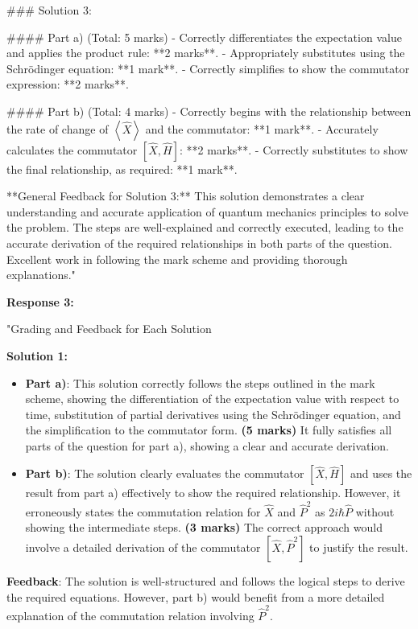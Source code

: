 \documentclass[a4paper,11pt]{article}
\begin{document}
### Solution 3:

#### Part a) (Total: 5 marks)
- Correctly differentiates the expectation value and applies the product rule: **2 marks**.
- Appropriately substitutes using the Schrödinger equation: **1 mark**.
- Correctly simplifies to show the commutator expression: **2 marks**.

#### Part b) (Total: 4 marks)
- Correctly begins with the relationship between the rate of change of \( \left<\hat{X}\right> \) and the commutator: **1 mark**.
- Accurately calculates the commutator \([ \hat{X}, \hat{H} ]\): **2 marks**.
- Correctly substitutes to show the final relationship, as required: **1 mark**.

**General Feedback for Solution 3:** This solution demonstrates a clear understanding and accurate application of quantum mechanics principles to solve the problem. The steps are well-explained and correctly executed, leading to the accurate derivation of the required relationships in both parts of the question. Excellent work in following the mark scheme and providing thorough explanations."

\textbf{Response 3:}

"Grading and Feedback for Each Solution

\textbf{Solution 1:}

\begin{itemize}
    \item \textbf{Part a)}: This solution correctly follows the steps outlined in the mark scheme, showing the differentiation of the expectation value with respect to time, substitution of partial derivatives using the Schr\"odinger equation, and the simplification to the commutator form. \textbf{(5 marks)} It fully satisfies all parts of the question for part a), showing a clear and accurate derivation.
    
    \item \textbf{Part b)}: The solution clearly evaluates the commutator \(\left[ \hat{X}, \hat{H}\right]\) and uses the result from part a) effectively to show the required relationship. However, it erroneously states the commutation relation for \(\hat{X}\) and \(\hat{P}^2\) as \(2i\hbar\hat{P}\) without showing the intermediate steps. \textbf{(3 marks)} The correct approach would involve a detailed derivation of the commutator \(\left[ \hat{X}, \hat{P}^2\right]\) to justify the result.
\end{itemize}

\textbf{Feedback}: The solution is well-structured and follows the logical steps to derive the required equations. However, part b) would benefit from a more detailed explanation of the commutation relation involving \(\hat{P}^2\).
\end{document}
